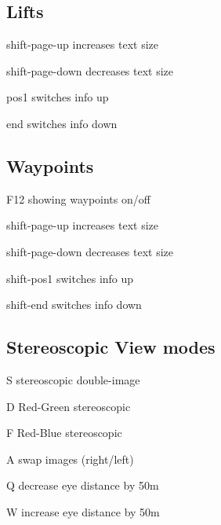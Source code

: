 \subsection*{Lifts}
\begin{keys}
\item[shift-page-up] increases text size
\item[shift-page-down] decreases text size
\item[pos1] switches info up
\item[end] switches info down
\end{keys}

\subsection*{Waypoints}
\begin{keys}
\item[F12] showing waypoints on/off
\item[shift-page-up] increases text size
\item[shift-page-down] decreases text size
\item[shift-pos1] switches info up
\item[shift-end] switches info down
\end{keys}


\subsection*{Stereoscopic View modes}

\begin{keys}
\item[S]        stereoscopic double-image
\item[D]        Red-Green stereoscopic
\item[F]        Red-Blue stereoscopic
\item[A]        swap images (right/left)
\item[Q]        decrease eye distance by 50m
\item[W]        increase eye distance by 50m
\end{keys}



